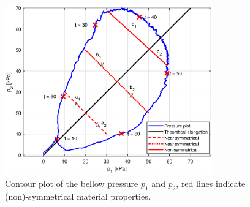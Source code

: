 \begin{figure}[H]
    \centering
    \includegraphics[width = 0.8\textwidth]{Figures/Chapter5/pressurecontour.eps}
    \caption{Contour plot of the bellow pressure $p_1$ and $p_2$, red lines indicate (non)-symmetrical material properties.}
    \label{fig5:pressureellips}
\end{figure}






















